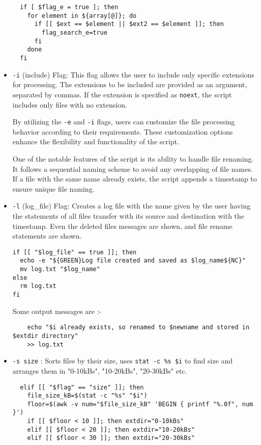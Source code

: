 \documentclass{article}
\begin{document}
\begin{itemize}
\begin{verbatim}
  if [ $flag_e = true ]; then
    for element in ${array[@]}; do
      if [[ $ext == $element || $ext2 == $element ]]; then
        flag_search_e=true
      fi
    done
  fi
  \end{verbatim}
  \item \texttt{-i} (include) Flag: This flag allows the user to include only specific extensions for processing. The extensions to be included are provided as an argument, separated by commas. If the extension is specified as \texttt{noext}, the script includes only files with no extension.

By utilizing the \texttt{-e} and \texttt{-i} flags, users can customize the file processing behavior according to their requirements. These customization options enhance the flexibility and functionality of the script.

One of the notable features of the script is its ability to handle file renaming. It follows a sequential naming scheme to avoid any overlapping of file names. If a file with the same name already exists, the script appends a timestamp to ensure unique file naming.
  \item \texttt{-l} (log\_file) Flag: Creates a log file with the name given by the user having the statements of all files transfer with its source and destination with the timestamp. Even the deleted files messages are shown, and file rename statements are shown.
  \begin{verbatim}
if [[ "$log_file" == true ]]; then
  echo -e "${GREEN}Log file created and saved as $log_name${NC}"
  mv log.txt "$log_name"
else
  rm log.txt
fi
  \end{verbatim}
  Some output messages are :-
  \begin{verbatim}
    echo "$i already exists, so renamed to $newname and stored in $extdir directory"
    >> log.txt
  \end{verbatim}
  \item \texttt{-s size} : Sorts files by their size, uses \texttt{stat -c \%s \$i} to find size and arranges them in "0-10kBs", "10-20kBs", "20-30kBs" etc.
  \begin{verbatim}
  elif [[ "$flag" == "size" ]]; then
    file_size_kB=$(stat -c "%s" "$i")
    floor=$(awk -v num="$file_size_kB" 'BEGIN { printf "%.0f", num }')
    if [[ $floor < 10 ]]; then extdir="0-10kBs"
    elif [[ $floor < 20 ]]; then extdir="10-20kBs"
    elif [[ $floor < 30 ]]; then extdir="20-30kBs"

\end{verbatim}
\end{itemize}
\end{document}

